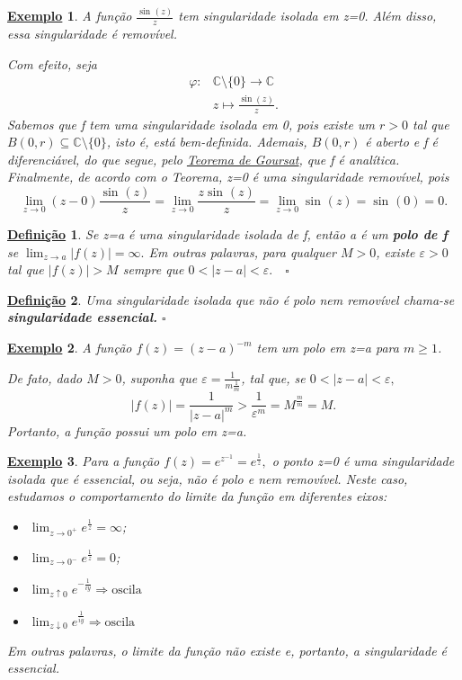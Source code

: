 \documentclass{article}
\newtheorem*{def*}{\underline{Defini\c c\~ao}}
\newtheorem{example}{\underline{Exemplo}}[section]
\begin{document}
  \begin{example}
    A função \(\frac{\sin^{}{(z)}}{z}\) tem singularidade isolada em z=0. Além disso, essa singularidade é removível.

    Com efeito, seja 
    \begin{align*}
      \varphi :&\mathbb{C}\setminus{\{0\}}\rightarrow \mathbb{C}\\
               &z\mapsto \frac{\sin{(z)}}{z}.
    \end{align*}
    Sabemos que f tem uma singularidade isolada em 0, pois existe um \(r > 0\) tal que \(B(0, r)\subseteq \mathbb{C}\setminus{\{0\}}\), isto é, está bem-definida. Ademais, \(B(0, r)\) é aberto 
    e f é diferenciável, do que segue, pelo \hyperlink{goursat}{Teorema de Goursat}, que f é analítica. Finalmente, de acordo com o Teorema, z=0 é uma singularidade removível, pois 
    \[
      \lim_{z\to 0}(z-0)\frac{\sin^{}{(z)}}{z} = \lim_{z\to 0}\frac{z\sin^{}{(z)}}{z} = \lim_{z\to 0}\sin^{}{(z)} = \sin^{}{(0)} = 0.
    \]
  \end{example}
  \begin{def*}
    Se z=a é uma singularidade isolada de f, então a é um \textbf{polo de f} se \(\lim_{z\to a}|f(z)| = \infty.\) Em outras palavras,
    para qualquer \(M > 0\), existe \(\varepsilon > 0\) tal que \(|f(z)| > M\) sempre que \(0 < |z-a| < \varepsilon .\quad \square\) 
  \end{def*}
  \begin{def*}
    Uma singularidade isolada que não é polo nem removível chama-se \textbf{singularidade essencial.} \(\square\)
  \end{def*}
  \begin{example}
    A função \(f(z) = (z-a)^{-m}\) tem um polo em z=a para \(m\geq 1\).

    De fato, dado \(M > 0\), suponha que \(\varepsilon  = \frac{1}{m \frac{1}{m}}\), tal que, se \(0 < |z-a| < \varepsilon ,\)
    \[
      |f(z)| = \frac{1}{|z-a|^{m}}> \frac{1}{\varepsilon ^{m}} = M^{\frac{m}{m}} = M.
    \]
  Portanto, a função possui um polo em z=a.
  \end{example}
  \begin{example}
    Para a função \(f(z) = e^{z^{-1}} = e^{\frac{1}{z}},\) o ponto z=0 é uma singularidade isolada que é essencial, ou seja, não é polo e nem removível. Neste caso, estudamos o comportamento do limite
  da função em diferentes eixos:
 \begin{itemize}
   \item \(\lim_{z\to 0^{+}}e^{\frac{1}{z}} = \infty\);
   \item \(\lim_{z\to 0^{-}}e^{\frac{1}{z}} = 0\);
   \item \(\lim_{z \uparrow 0}e^{-\frac{1}{iy}} \Rightarrow \text{oscila}\)
   \item \(\lim_{z \downarrow 0}e^{\frac{1}{iy}} \Rightarrow \text{oscila}\)
 \end{itemize}
  Em outras palavras, o limite da função não existe e, portanto, a singularidade é essencial.
  \end{example}
\end{document}
